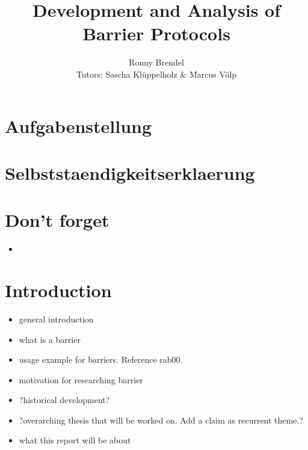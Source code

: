 \documentclass[a4paper, 10pt]{article}
\title{Development and Analysis of Barrier Protocols}
\author{Ronny Brendel\\Tutors: Sascha Kl\"uppelholz \& Marcus V\"olp}
\begin{document}

\maketitle

\pagebreak
\newpage \thispagestyle{empty} \mbox{}
\pagebreak

\section*{Aufgabenstellung}

\pagebreak
\newpage \thispagestyle{empty} \mbox{}
\pagebreak

\section*{Selbststaendigkeitserklaerung}

\pagebreak
\newpage \thispagestyle{empty} \mbox{}
\pagebreak

\renewcommand{\contentsname}{Table of contents}
\tableofcontents

\pagebreak
\newpage \thispagestyle{empty} \mbox{}
\pagebreak

\section{Don't forget}
\begin{itemize}
	\item 
\end{itemize}

\section{Introduction}
\begin{itemize}
	\item general introduction
	\item what is a barrier
	\item usage example for barriers. Reference rab00.
	\item motivation for researching barrier
	\item ?historical development?
	\item ?overarching thesis that will be worked on. Add a claim as recurrent theme.?
	\item what this report will be about
\end{itemize}
\end{document}
